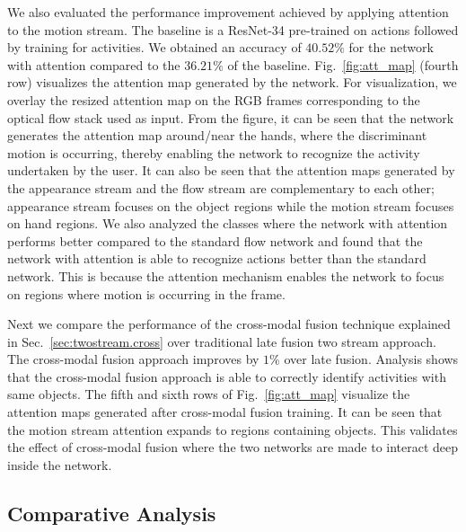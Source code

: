 \documentclass[10pt,twocolumn,letterpaper]{article}
\begin{document}
We also evaluated the performance improvement achieved by applying attention to the motion stream. The baseline is a ResNet-34 pre-trained on actions followed by training for activities. We obtained an accuracy of $40.52\%$ for the network with attention compared to the $36.21\%$ of the baseline. Fig.~\ref{fig:att_map} (fourth row) visualizes the attention map generated by the network. For visualization, we overlay the resized attention map on the RGB frames corresponding to the optical flow stack used as input. From the figure, it can be seen that the network generates the attention map around/near the hands, where the discriminant motion is occurring, thereby enabling the network to recognize the activity undertaken by the user. It can also be seen that the attention maps generated by the appearance stream and the flow stream are complementary to each other; appearance stream focuses on the object regions while the motion stream focuses on hand regions. We also analyzed the classes where the network with attention performs better compared to the standard flow network and found that the network with attention is able to recognize actions better than the standard network. This is because the attention mechanism enables the network to focus on regions where motion is occurring in the frame.

Next we compare the performance of the cross-modal fusion technique explained in Sec.~\ref{sec:twostream.cross} over traditional late fusion two stream approach. The cross-modal fusion approach improves by $1\%$ over late fusion. Analysis shows that the cross-modal fusion approach is able to correctly identify activities with same objects. The fifth and sixth rows of Fig.~\ref{fig:att_map} visualize the attention maps generated after cross-modal fusion training. It can be seen that the motion stream attention expands to regions containing objects. This validates the effect of cross-modal fusion where the two networks are made to interact deep inside the network.



\subsection{Comparative Analysis}
\end{document}
